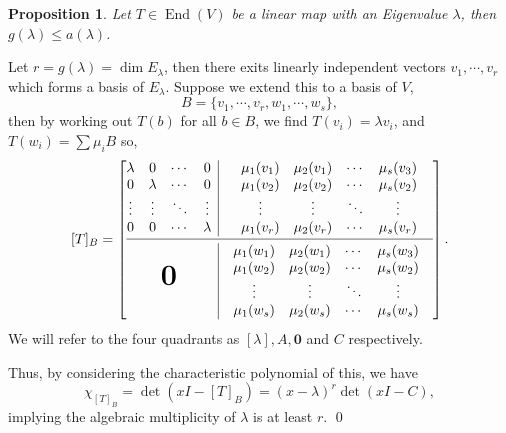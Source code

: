 \documentclass[
]{article}
\newtheorem{prop}{Proposition}[section]
\theoremstyle{definition}
\begin{document}
\begin{prop}
  Let \(T \in \mathop{\mathrm{End}}(V)\) be a linear map with an Eigenvalue \(\lambda\), then 
  \(g(\lambda) \le a(\lambda)\).
\end{prop}
\proof

Let \(r = g(\lambda) = \dim E_{\lambda}\), then there exits linearly
independent vectors \(v_1, \cdots, v_r\) which forms a basis of
\(E_{\lambda}\). Suppose we extend this to a basis of \(V\),
\[B = \{v_1, \cdots, v_r, w_1, \cdots, w_s\},\] then by working out
\(T(b)\) for all \(b \in B\), we find \(T(v_i) = \lambda v_i\), and
\(T(w_i) = \sum \mu_i B\) so, \[ [T]_B =
  \left[
    \begin{array}{@{}c|c@{}}
      \begin{matrix}
        \lambda & 0 & \cdots & 0 \\
        0 & \lambda & \cdots & 0 \\
        \vdots & \vdots & \ddots & \vdots \\
        0 & 0 & \cdots & \lambda \\
      \end{matrix}
          & 
      \begin{matrix}
        \mu_1(v_1) & \mu_2(v_1) & \cdots & \mu_s(v_3) \\
        \mu_1(v_2) & \mu_2(v_2) & \cdots & \mu_s(v_2) \\
        \vdots & \vdots & \ddots & \vdots\\
        \mu_1(v_r) & \mu_2(v_r) & \cdots & \mu_s(v_r)\\
      \end{matrix} \\
      \cmidrule[0.4pt]{1-2}
      \textbf{\text{\huge0}} & \hspace{2mm}
      \begin{matrix}
        \mu_1(w_1) & \mu_2(w_1) & \cdots & \mu_s(w_3)\\
        \mu_1(w_2) & \mu_2(w_2) & \cdots & \mu_s(w_2)\\
        \vdots & \vdots & \ddots & \vdots &\\
        \mu_1(w_s) & \mu_2(w_s) & \cdots & \mu_s(w_s)\\
      \end{matrix} \\
    \end{array} 
  \right]. \] We will refer to the four quadrants as
\([\lambda], A, \mathbf{0}\) and \(C\) respectively.

Thus, by considering the characteristic polynomial of this, we have
\[\chi_{[T]_B} = \det(xI - [T]_B) =  (x - \lambda)^r \det(xI - C),\]
implying the algebraic multiplicity of \(\lambda\) is at least \(r\).
\qed
\end{document}

